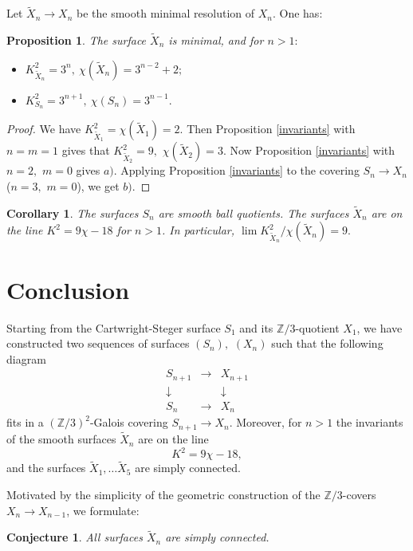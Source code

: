 \documentclass[10pt,a4paper]{article}
\newcommand{\ZZ}{\mathbb{Z}}
\newtheorem{corollary}[theorem]{Corollary}
\newtheorem{proposition}[theorem]{Proposition}
\newtheorem{conjecture}[theorem]{Conjecture}
\begin{document}
Let $\tilde X_n\to X_n$ be the smooth minimal resolution of $X_n.$ One has:
\begin{proposition}\label{invs}
The surface $\tilde X_{n}$ is minimal, and for $n>1:$
\begin{itemize}
\item[$a)$] $K_{\tilde X_n}^2=3^{n},\ \chi(\tilde X_n)=3^{n-2}+2;$
\item[$b)$] $K_{S_n}^2=3^{n+1},\ \chi(S_n)=3^{n-1}.$
\end{itemize}
\end{proposition}

\begin{proof}
We have $K_{\tilde X_1}^2=\chi(\tilde X_1)=2.$ Then Proposition \ref{invariants} with $n=m=1$
gives that $K_{\tilde X_2}^2=9,$ $\chi(\tilde X_2)=3.$ Now Proposition \ref{invariants} with $n=2,$ $m=0$
gives $a).$ Applying Proposition \ref{invariants} to the covering $S_n\to X_n$ ($n=3,$ $m=0$),
we get $b).$
\end{proof}

\begin{corollary}
The surfaces $S_n$ are smooth ball quotients. The surfaces $\tilde X_n$ are on the line
$K^2=9\chi-18$ for $n>1$. In particular, $\lim K_{\tilde X_n}^2/\chi(\tilde X_n)=9.$
\end{corollary}


\section{Conclusion}


Starting from the Cartwright-Steger surface $S_1$ and its $\ZZ/3$-quotient $X_1$,
we have constructed two sequences of surfaces $(S_{n}),$
$(X_{n})$ such that the following diagram
\[
\begin{array}{ccc}
S_{n+1} & \longrightarrow & X_{n+1}\\
\downarrow &  & \downarrow\\
S_{n} & \longrightarrow & X_{n}
\end{array}
\]
fits in a $(\ZZ/3)^2$-Galois covering $S_{n+1}\to X_n.$
Moreover, for $n>1$ the invariants of the smooth surfaces $\tilde X_n$ are on the line $$K^2=9\chi-18,$$
and the surfaces $\tilde X_{1},\ldots \tilde X_{5}$ are simply connected. 

Motivated by the simplicity of the geometric construction of the \(\ZZ/3\)-covers
\(X_n \to X_{n-1}\), we formulate:
\begin{conjecture}
All surfaces $\tilde X_{n}$ are simply connected.
\end{conjecture}
\end{document}
